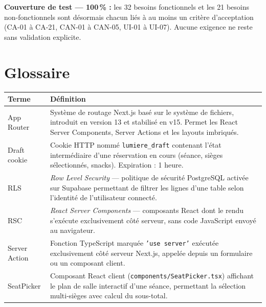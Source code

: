 \documentclass[12pt,a4paper,openany]{report}
\begin{document}
\begin{notebox}
\textbf{Couverture de test — 100\,\% :} les 32 besoins fonctionnels et les 21 besoins non-fonctionnels sont désormais chacun liés à au moins un critère d'acceptation (CA-01 à CA-21, CAN-01 à CAN-05, UI-01 à UI-07). Aucune exigence ne reste sans validation explicite.
\end{notebox}

\chapter{Glossaire}

\begin{longtable}{lp{10cm}}
  \toprule
  \textbf{Terme} & \textbf{Définition} \\
  \midrule
  \endhead
  \bottomrule
  \endfoot

  App Router        & Système de routage Next.js basé sur le système de fichiers, introduit en version 13 et stabilisé en v15. Permet les React Server Components, Server Actions et les layouts imbriqués. \\[4pt]

  Draft cookie      & Cookie HTTP nommé \texttt{lumiere\_draft} contenant l'état intermédiaire d'une réservation en cours (séance, sièges sélectionnés, snacks). Expiration : 1 heure. \\[4pt]

  RLS               & \textit{Row Level Security} — politique de sécurité PostgreSQL activée sur Supabase permettant de filtrer les lignes d'une table selon l'identité de l'utilisateur connecté. \\[4pt]

  RSC               & \textit{React Server Components} — composants React dont le rendu s'exécute exclusivement côté serveur, sans code JavaScript envoyé au navigateur. \\[4pt]

  Server Action     & Fonction TypeScript marquée \texttt{'use server'} exécutée exclusivement côté serveur Next.js, appelée depuis un formulaire ou un composant client. \\[4pt]

  SeatPicker        & Composant React client (\texttt{components/SeatPicker.tsx}) affichant le plan de salle interactif d'une séance, permettant la sélection multi-sièges avec calcul du sous-total. \\[4pt]


\end{longtable}
\end{document}
